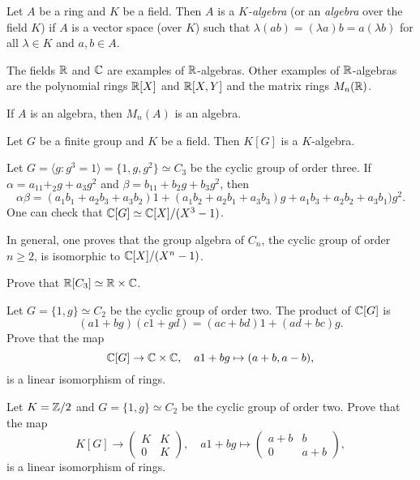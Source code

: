 \begin{definition}
Let $A$ be a ring and $K$ be a field. Then $A$ is a \emph{$K$-algebra} (or an \emph{algebra} 
over the field $K$) if $A$ is a vector space (over $K$)
such that $\lambda(ab)=(\lambda a)b=a(\lambda b)$ for all $\lambda\in K$ and $a,b\in A$. 
\end{definition}

The fields $\mathbb{R}$ and $\mathbb{C}$ are examples of $\mathbb{R}$-algebras. 
Other examples of $\mathbb{R}$-algebras are the 
polynomial rings $\mathbb{R}[X]$ and $\mathbb{R}[X,Y]$ and the matrix rings $M_n(\mathbb{R})$.  

\begin{example}
	If $A$ is an algebra, then $M_n(A)$ is an algebra.	
\end{example}

\begin{example}
    Let $G$ be a finite group and $K$ be a field. Then $K[G]$ is a $K$-algebra. 
\end{example}

\begin{example}
	Let $G=\langle g:g^3=1\rangle=\{1,g,g^2\}\simeq C_3$ be the cyclic group of order three. 
	If $\alpha=a_11+_2g+a_3g^2$ and $\beta=b_11+b_2g+b_3g^2$, then
	\[
		\alpha\beta=(a_1b_1+a_2b_3+a_3b_2)1+(a_1b_2+a_2b_1+a_3b_3)g+a_1b_3+a_2b_2+a_3b_1)g^2.
	\]
	One can check that $\mathbb{C}[G]\simeq\mathbb{C}[X]/(X^3-1)$. 
\end{example}

In general, one proves that the group algebra of $C_n$, the cyclic group of order $n\geq2$, 
is isomorphic to $\mathbb{C}[X]/(X^n-1)$.

\begin{exercise}
\label{xca:RC3}
	Prove that $\mathbb{R}[C_3]\simeq\mathbb{R}\times\mathbb{C}$. 	
\end{exercise}

\begin{exercise}
	Let $G=\{1,g\}\simeq C_2$ be the cyclic group of order two. The product
	of $\mathbb{C}[G]$ is 
	\[
	(a1+bg)(c1+gd)=(ac+bd)1+(ad+bc)g.
	\]
	Prove that the map 
 \[
 \mathbb{C}[G]\to \mathbb{C}\times \mathbb{C},\quad a1+bg\mapsto (a+b,a-b),
 \]
	is a linear isomorphism of rings. 
\end{exercise}

\begin{exercise}
	Let $K=\mathbb{Z}/2$ and $G=\{1,g\}\simeq C_2$ be the cyclic group of order two. 
	Prove that the map 
 \[
 K[G]\to\begin{pmatrix}
		K&K\\
		0&K
	\end{pmatrix},\quad 
 a1+bg\mapsto\begin{pmatrix}
		a+b&b\\
		0&a+b		
	\end{pmatrix},
    \]
    is a linear isomorphism of rings.
\end{exercise}

